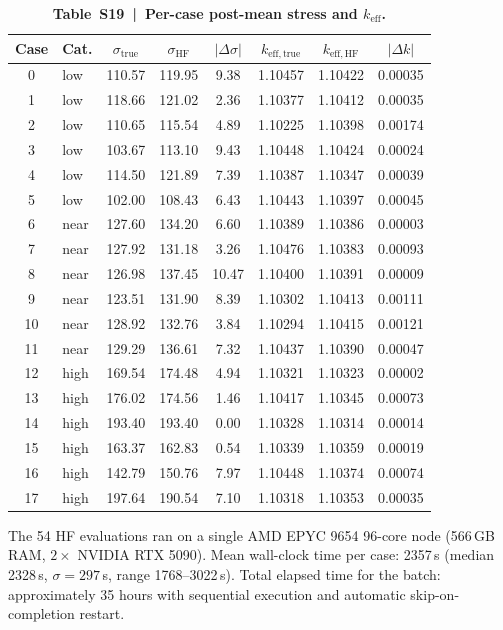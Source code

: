 \documentclass[11pt,a4paper]{article}
\newcommand{\keff}{\ensuremath{k_{\mathrm{eff}}}}
\begin{document}
\begin{table}[htbp]
\centering
\caption{\textbf{Table~S19~|~Per-case post-mean stress and \keff{}.}}
\label{tab:S19}
\smallskip
\small
\begin{tabular}{clcccccc}
\toprule
Case & Cat. & $\sigma_{\mathrm{true}}$ & $\sigma_{\mathrm{HF}}$ & $|\Delta\sigma|$ & $k_{\mathrm{eff,true}}$ & $k_{\mathrm{eff,HF}}$ & $|\Delta k|$ \\
\midrule
 0 & low  & 110.57 & 119.95 &  9.38 & 1.10457 & 1.10422 & 0.00035 \\
 1 & low  & 118.66 & 121.02 &  2.36 & 1.10377 & 1.10412 & 0.00035 \\
 2 & low  & 110.65 & 115.54 &  4.89 & 1.10225 & 1.10398 & 0.00174 \\
 3 & low  & 103.67 & 113.10 &  9.43 & 1.10448 & 1.10424 & 0.00024 \\
 4 & low  & 114.50 & 121.89 &  7.39 & 1.10387 & 1.10347 & 0.00039 \\
 5 & low  & 102.00 & 108.43 &  6.43 & 1.10443 & 1.10397 & 0.00045 \\
 6 & near & 127.60 & 134.20 &  6.60 & 1.10389 & 1.10386 & 0.00003 \\
 7 & near & 127.92 & 131.18 &  3.26 & 1.10476 & 1.10383 & 0.00093 \\
 8 & near & 126.98 & 137.45 & 10.47 & 1.10400 & 1.10391 & 0.00009 \\
 9 & near & 123.51 & 131.90 &  8.39 & 1.10302 & 1.10413 & 0.00111 \\
10 & near & 128.92 & 132.76 &  3.84 & 1.10294 & 1.10415 & 0.00121 \\
11 & near & 129.29 & 136.61 &  7.32 & 1.10437 & 1.10390 & 0.00047 \\
12 & high & 169.54 & 174.48 &  4.94 & 1.10321 & 1.10323 & 0.00002 \\
13 & high & 176.02 & 174.56 &  1.46 & 1.10417 & 1.10345 & 0.00073 \\
14 & high & 193.40 & 193.40 &  0.00 & 1.10328 & 1.10314 & 0.00014 \\
15 & high & 163.37 & 162.83 &  0.54 & 1.10339 & 1.10359 & 0.00019 \\
16 & high & 142.79 & 150.76 &  7.97 & 1.10448 & 1.10374 & 0.00074 \\
17 & high & 197.64 & 190.54 &  7.10 & 1.10318 & 1.10353 & 0.00035 \\
\bottomrule
\end{tabular}
\end{table}

The 54 HF evaluations ran on a single AMD EPYC 9654 96-core node
(566\,GB RAM, $2\times$ NVIDIA RTX 5090). Mean wall-clock time per case:
2357\,s (median 2328\,s, $\sigma = 297$\,s, range 1768--3022\,s). Total
elapsed time for the batch: approximately 35 hours with sequential
execution and automatic skip-on-completion restart.
\end{document}
